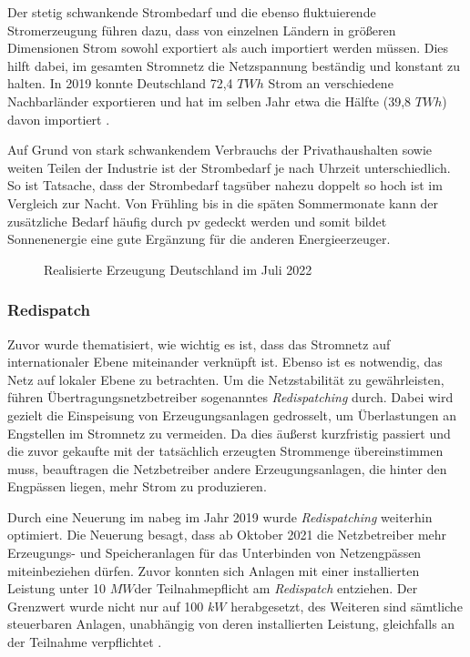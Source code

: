 \documentclass[12pt, a4paper]{article}
\begin{document}
Der stetig schwankende Strombedarf und die ebenso fluktuierende Stromerzeugung führen dazu, dass von einzelnen Ländern in größeren Dimensionen Strom sowohl exportiert als auch importiert werden müssen. Dies hilft dabei, im gesamten Stromnetz die Netzspannung beständig und konstant zu halten. In 2019 konnte Deutschland 72,4 $TWh$ Strom an verschiedene Nachbarländer exportieren und hat im selben Jahr etwa die Hälfte (39,8 $TWh$) davon importiert \cite{ws:bmwk}.

Auf Grund von stark schwankendem Verbrauchs der Privathaushalten sowie weiten Teilen der Industrie ist der Strombedarf je nach Uhrzeit unterschiedlich. So ist Tatsache, dass der Strombedarf tagsüber nahezu doppelt so hoch ist im Vergleich zur Nacht. Von Frühling bis in die späten Sommermonate kann der zusätzliche Bedarf häufig durch \ac{pv} gedeckt werden und somit bildet Sonnenenergie eine gute Ergänzung für die anderen Energieerzeuger. 


\begin{figure}
\centering
\def\svgwidth{450pt}
\fontsize{7}{10}\selectfont

\caption{Realisierte Erzeugung Deutschland im Juli 2022}
\label{fig:stromerzeugung_de_mai}
\end {figure}

\subsubsection{Redispatch}

Zuvor wurde thematisiert, wie wichtig es ist, dass das Stromnetz auf internationaler Ebene miteinander verknüpft ist. Ebenso ist es notwendig, das Netz auf lokaler Ebene zu betrachten. Um die Netzstabilität zu gewährleisten, führen Übertragungsnetzbetreiber sogenanntes \textit{Redispatching} durch. Dabei wird gezielt die Einspeisung von Erzeugungsanlagen gedrosselt, um Überlastungen an Engstellen im Stromnetz zu vermeiden. Da dies äußerst kurzfristig passiert und die zuvor gekaufte mit der tatsächlich erzeugten Strommenge übereinstimmen muss, beauftragen die Netzbetreiber andere Erzeugungsanlagen, die hinter den Engpässen liegen, mehr Strom zu produzieren.

Durch eine Neuerung im \ac{nabeg}  im Jahr 2019 wurde \textit{Redispatching} weiterhin optimiert. Die Neuerung besagt, dass ab Oktober 2021 die Netzbetreiber mehr Erzeugungs- und Speicheranlagen für das Unterbinden von Netzengpässen miteinbeziehen dürfen. Zuvor konnten sich Anlagen mit einer installierten Leistung unter 10 $MW$der Teilnahmepflicht am \textit{Redispatch} entziehen. Der Grenzwert wurde nicht nur auf 100 $kW$ herabgesetzt, des Weiteren sind sämtliche steuerbaren Anlagen, unabhängig von deren installierten Leistung, gleichfalls an der Teilnahme verpflichtet \cite{ws:bmwk}.
\end{document}
